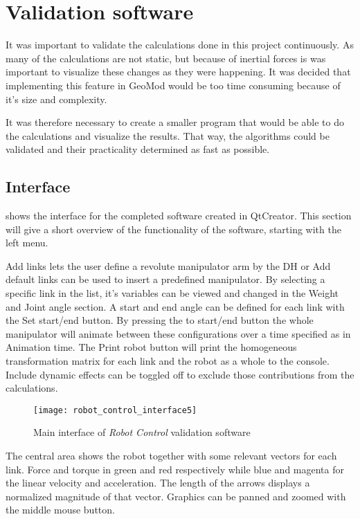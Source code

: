 \chapter{Validation software}

It was important to validate the calculations done in this project continuously. As many of the calculations are not static, but because of inertial forces is was important to visualize these changes as they were happening. It was decided that implementing this feature in GeoMod would be too time consuming because of it's size and complexity. 

It was therefore necessary to create a smaller program that would be able to do the calculations and visualize the results. That way, the algorithms could be validated and their practicality determined as fast as possible.


\section{Interface}\label{interfaceSec}

 shows the interface for the completed software created in QtCreator. This section will give a short overview of the functionality of the software, starting with the left menu.

\textsf{Add links} lets the user define a revolute manipulator arm by the \gls{DH} or \textsf{Add default links} can be used to insert a predefined manipulator. By selecting a specific link in the list, it's variables can be viewed and changed in the \textsf{Weight} and \textsf{Joint angle} section. A start and end angle can be defined for each link with the \textsf{Set start/end} button. By pressing the \textsf{to start/end} button the whole manipulator will animate between these configurations over a time specified as in \textsf{Animation time}. The \textsf{Print robot} button will print the homogeneous transformation matrix for each link and the robot as a whole to the console. \textsf{Include dynamic effects} can be toggled off to exclude those contributions from the calculations.

\begin{figure}[h!]
    \centering
    \texttt{[image: robot\_control\_interface5]}
    \caption{Main interface of \textit{Robot Control} validation software}
    \label{interface}
\end{figure}

The central area shows the robot together with some relevant vectors for each link. Force and torque in green and red respectively while blue and magenta for the linear velocity and acceleration. The length of the arrows displays a normalized magnitude of that vector. Graphics can be panned and zoomed with the middle mouse button.

